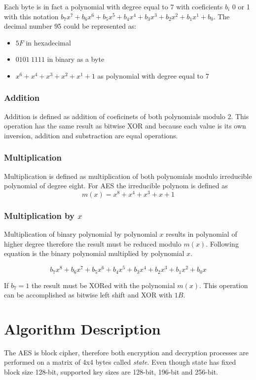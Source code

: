 Each byte is in fact a polynomial with degree equal to 7 with coeficients
$b_i$ 0 or 1 with this notation $b_7x^7 + b_6x^6 + b_5x^5 + b_4x^4 + b_3x^3
+ b_2x^2 + b_1x^1 + b_0$. The decimal number 95 could be represented as:
\begin{itemize}
\item $5F$ in hexadecimal
\item $0101~1111$ in binary as a byte
\item $x^6 + x^4 + x^3 + x^2 + x^1 + 1$ as polynomial with degree equal to 7
\end{itemize}

\subsubsection*{Addition}
Addition is defined as addition of coeficinets of both polynomials modulo
2. This operation has the same result as bitwise XOR and because 
each value is its own inversion, addition and substraction are equal
operations.

\subsubsection*{Multiplication}
Multiplication is defined as multiplication of both polynomials modulo
irreducible polynomial of degree eight. For AES the irreducible polynom
is defined as
\begin{equation}
m(x) = x^8 + x^4 + x^3 + x + 1
\end{equation}

\subsubsection*{Multiplication by $x$}
Multiplication of binary polynomial by polynomial $x$ results in polynomial of
higher degree therefore the result must be reduced modulo $m(x)$. Following
equation is the binary polynomial multiplied by polynomial $x$.

\begin{equation}
b_7x^8+b_6x^7+b_5x^6+b_4x^5+b_3x^4+b_2x^3+b_1x^2+b_0x
\end{equation} 

If $b_7 = 1$ the result must be XORed with the polynomial $m(x)$. This operation
can be accomplished as bitwise left shift and XOR with $1B$.

\section{Algorithm Description}
The AES is block cipher, therefore both encryption and decryption processes
are performed on a matrix of 4x4 bytes called \textit{state}. Even though
state has fixed block size 128-bit, supported key sizes are 128-bit, 196-bit
and 256-bit. 

